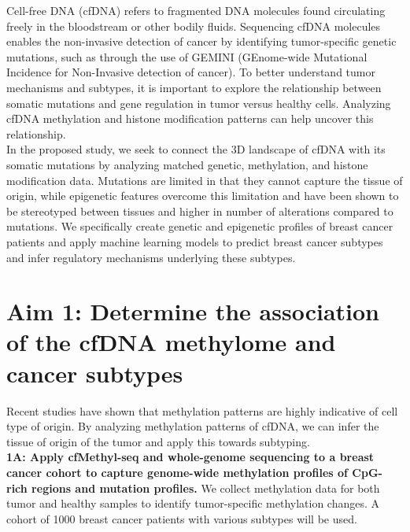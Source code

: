 \documentclass[11pt]{article}
\title{}
\author{}
\date{}
\begin{document}
\vspace{-1cm}

\noindent Cell-free DNA (cfDNA) refers to fragmented DNA molecules found circulating freely in the bloodstream or other bodily fluids. 
Sequencing cfDNA molecules enables the non-invasive detection of cancer by identifying tumor-specific genetic mutations, such as through the use of GEMINI (GEnome-wide Mutational Incidence for Non-Invasive detection of cancer). \cite{bruhm_single-molecule_2023}
To better understand tumor mechanisms and subtypes, it is important to explore the relationship between somatic mutations and gene regulation in tumor versus healthy cells. Analyzing cfDNA methylation and histone modification patterns can help uncover this relationship. \cite{penny_chromatin-_2024, baca_liquid_2023} \\
In the proposed study, we seek to connect the 3D landscape of cfDNA with its somatic mutations by analyzing matched genetic, methylation, and histone modification data. 
Mutations are limited in that they cannot capture the tissue of origin, while epigenetic features overcome this limitation and have been shown to be stereotyped between tissues and higher in number of alterations compared to mutations. \cite{penny_chromatin-_2024, bie_multimodal_2023, cisneros-villanueva_cell-free_2022}
We specifically create genetic and epigenetic profiles of breast cancer patients and apply machine learning models to predict breast cancer subtypes and infer regulatory mechanisms underlying these subtypes.
\section*{Aim 1: Determine the association of the cfDNA methylome and cancer subtypes}
Recent studies have shown that methylation patterns are highly indicative of cell type of origin.\cite{spector_methylome_2023} 
By analyzing methylation patterns of cfDNA, we can infer the tissue of origin of the tumor and apply this towards subtyping.
\medskip \\
\noindent \textbf{1A: Apply cfMethyl-seq \cite{stackpole_cost-effective_2022} and whole-genome sequencing to a breast cancer cohort to capture genome-wide methylation profiles of CpG-rich regions and mutation profiles.} We collect methylation data for both tumor and healthy samples to identify tumor-specific methylation changes. A cohort of 1000 breast cancer patients with various subtypes will be used. 
\end{document}
